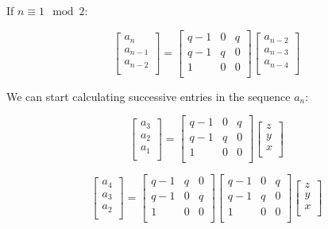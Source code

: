 \documentclass[paper.tex]{subfiles}
\begin{document}
If $n \equiv 1 \mod 2$:

\[
\left[ \begin{array}{ccc}
a_{n} \\
a_{n-1} \\
a_{n-2} \\
\end{array} \right]
=
\left[ \begin{array}{ccc}
q-1 & 0 & q \\
q-1 & q & 0 \\
1 & 0 & 0 \\
\end{array} \right]
\left[ \begin{array}{ccc}
a_{n-2} \\
a_{n-3} \\
a_{n-4} \\
\end{array} \right]
\]


We can start calculating successive entries in the sequence {$a_{n}$}:

\[
\left[ \begin{array}{ccc}
a_{3} \\
a_{2} \\
a_{1} \\
\end{array} \right]
=
\left[ \begin{array}{ccc}
q-1 & 0 & q \\
q-1 & q & 0 \\
1 & 0 & 0 \\
\end{array} \right]
\left[ \begin{array}{ccc}
z \\
y \\
x \\
\end{array} \right]
\]

\[
\left[ \begin{array}{ccc}
a_{4} \\
a_{3} \\
a_{2} \\
\end{array} \right]
=
\left[ \begin{array}{ccc}
q-1 & q & 0 \\
q-1 & 0 & q \\
1 & 0 & 0 \\
\end{array} \right]
\left[ \begin{array}{ccc}
q-1 & 0 & q \\
q-1 & q & 0 \\
1 & 0 & 0 \\
\end{array} \right]
\left[ \begin{array}{ccc}
z \\
y \\
x \\
\end{array} \right]
\]
\end{document}
